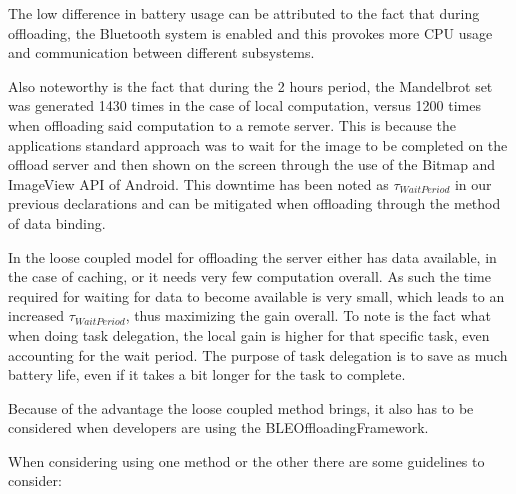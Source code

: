 The low difference in battery usage can be attributed to the fact that during offloading, the Bluetooth system is enabled and this provokes more CPU usage and communication between different subsystems.

Also noteworthy is the fact that during the 2 hours period, the Mandelbrot set was generated 1430 times in the case of local computation, versus 1200 times when offloading said computation to a remote server. This is because the applications standard approach was to wait for the image to be completed on the offload server and then shown on the screen through the use of the Bitmap and ImageView API of Android. This downtime has been noted as \(\tau_{WaitPeriod}\) in our previous declarations and can be mitigated when offloading through the method of data binding.

In the loose coupled model for offloading the server either has data available, in the case of caching, or it needs very few computation overall. As such the time required for waiting for data to become available is very small, which leads to an increased \(\tau_{WaitPeriod}\), thus maximizing the gain overall. To note is the fact what when doing task delegation, the local gain is higher for that specific task, even accounting for the wait period. The purpose of task delegation is to save as much battery life, even if it takes a bit longer for the task to complete.

Because of the advantage the loose coupled method brings, it also has to be considered when developers are using the BLEOffloadingFramework. 

When considering using one method or the other there are some guidelines to consider:

